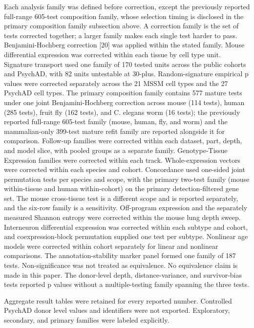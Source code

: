 \documentclass[11pt]{article}
\begin{document}
Each analysis family was defined before correction, except the previously reported full-range 605-test composition family, whose selection timing is disclosed in the primary composition family subsection above. A correction family is the set of tests corrected together; a larger family makes each single test harder to pass. Benjamini-Hochberg correction [20] was applied within the stated family. Mouse differential expression was corrected within each tissue by cell type unit. Signature transport used one family of 170 tested units across the public cohorts and PsychAD, with 82 units untestable at 30-plus. Random-signature empirical p values were corrected separately across the 21 MSSM cell types and the 27 PsychAD cell types. The primary composition family contains 577 mature tests under one joint Benjamini-Hochberg correction across mouse (114 tests), human (285 tests), fruit fly (162 tests), and C. elegans worm (16 tests); the previously reported full-range 605-test family (mouse, human, fly, and worm) and the mammalian-only 399-test mature refit family are reported alongside it for comparison. Follow-up families were corrected within each dataset, part, depth, and model slice, with pooled groups as a separate family. Genotype-Tissue Expression families were corrected within each track. Whole-expression vectors were corrected within each species and cohort. Concordance used one-sided joint permutation tests per species and scope, with the primary two-test family (mouse within-tissue and human within-cohort) on the primary detection-filtered gene set. The mouse cross-tissue test is a different scope and is reported separately, and the six-row family is a sensitivity. Off-program expression and the separately measured Shannon entropy were corrected within the mouse lung depth sweep. Interneuron differential expression was corrected within each subtype and cohort, and coexpression-block permutation supplied one test per subtype. Nonlinear age models were corrected within cohort separately for linear and nonlinear comparisons. The annotation-stability marker panel formed one family of 187 tests. Non-significance was not treated as equivalence. No equivalence claim is made in this paper. The donor-level depth, distance-variance, and survivor-bias tests reported p values without a multiple-testing family spanning the three tests.

Aggregate result tables were retained for every reported number. Controlled PsychAD donor level values and identifiers were not exported. Exploratory, secondary, and primary families were labeled explicitly.
\end{document}
